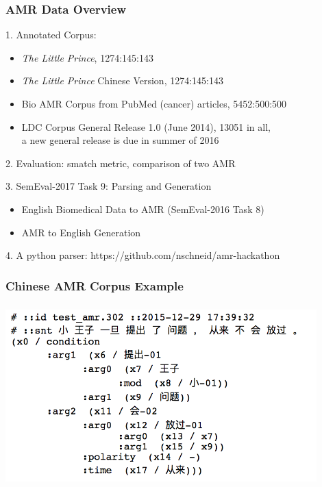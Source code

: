 \documentclass{beamer}
\begin{document}
\begin{frame}
    \frametitle{AMR Data Overview}

    1. Annotated Corpus:

    \begin{itemize}
        \item \emph{The Little Prince}, 1274:145:143
        \item \emph{The Little Prince} Chinese Version, 1274:145:143
        \item Bio AMR Corpus from PubMed (cancer) articles, 5452:500:500
        \item LDC Corpus General Release 1.0 (June 2014), 13051 in all, \\
            a new general release is due in summer of 2016
    \end{itemize}

    2. Evaluation: smatch metric, comparison of two AMR

    3. SemEval-2017 Task 9: Parsing and Generation

    \begin{itemize}
        \item English Biomedical Data to AMR (SemEval-2016 Task 8)
        \item AMR to English Generation
    \end{itemize}

    4. A python parser: https://github.com/nschneid/amr-hackathon

\end{frame}
\begin{frame}
    \frametitle{Chinese AMR Corpus Example}

    \begin{center}
        \includegraphics[height=7cm,width=12cm]{img/little-prince-chn-parse.png}
    \end{center}
\end{frame}
\end{document}
